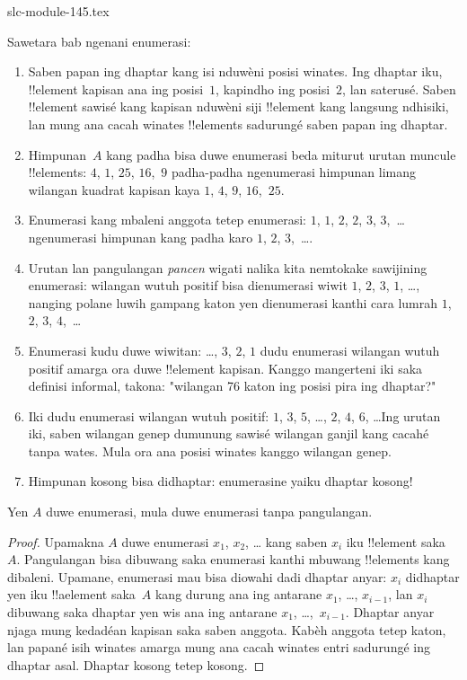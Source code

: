 \begin{filecontents*}[overwrite]{slc-module-145.tex}
\begin{explain}
Sawetara bab ngenani enumerasi:
\begin{enumerate}
\item Saben papan ing dhaptar kang isi nduwèni posisi winates. Ing dhaptar iku, !!{element} kapisan
  ana ing posisi~$1$, kapindho ing posisi~$2$, lan saterusé.
  Saben !!{element} sawisé kang kapisan nduwèni siji !!{element}
  kang langsung ndhisiki, lan mung ana cacah winates !!{element}s
  sadurungé saben papan ing dhaptar.
\item Himpunan~$A$ kang padha bisa duwe enumerasi beda
  miturut urutan muncule !!{element}s: $4$, $1$,
  $25$, $16$,~$9$ padha-padha ngenumerasi himpunan limang
  wilangan kuadrat kapisan kaya $1$, $4$, $9$, $16$,~$25$.
\item Enumerasi kang mbaleni anggota tetep enumerasi: $1$, $1$, $2$,
  $2$, $3$, $3$,~\dots{} ngenumerasi himpunan kang padha karo $1$, $2$,
  $3$,~\dots{}.
\item Urutan lan pangulangan \emph{pancen} wigati nalika kita nemtokake
  sawijining enumerasi: wilangan wutuh positif bisa dienumerasi wiwit
  $1$, $2$, $3$, $1$, \dots{}, nanging polane luwih gampang katon
  yen dienumerasi kanthi cara lumrah $1$, $2$, $3$, $4$,~\dots
\item Enumerasi kudu duwe wiwitan: \dots, $3$, $2$, $1$ dudu
  enumerasi wilangan wutuh positif amarga ora duwe !!{element}
  kapisan. Kanggo mangerteni iki saka definisi informal,
  takona: "wilangan 76 katon ing posisi pira ing dhaptar?"
\item Iki dudu enumerasi wilangan wutuh positif:
  $1$, $3$, $5$, \dots, $2$, $4$, $6$, \dots\@ Ing urutan iki,
  saben wilangan genep dumunung sawisé wilangan ganjil kang cacahé tanpa wates.
  Mula ora ana posisi winates kanggo wilangan genep.
\item Himpunan kosong bisa didhaptar: enumerasine yaiku dhaptar kosong!{}
\end{enumerate}
\end{explain}

\begin{prop}
  Yen $A$ duwe enumerasi, mula duwe enumerasi tanpa
  pangulangan.
\end{prop}

\begin{proof}
  Upamakna $A$ duwe enumerasi $x_1$, $x_2$, \dots{} kang saben
  $x_i$ iku !!{element} saka~$A$. Pangulangan bisa dibuwang saka
  enumerasi kanthi mbuwang !!{element}s kang dibaleni. Upamane,
  enumerasi mau bisa diowahi dadi dhaptar anyar: $x_i$ didhaptar yen
  iku !!a{element} saka~$A$ kang durung ana ing antarane $x_1$, \dots,
  $x_{i-1}$, lan $x_i$ dibuwang saka dhaptar yen wis ana ing antarane
  $x_1$, \dots,~$x_{i-1}$. Dhaptar anyar njaga mung kedadéan kapisan saka saben anggota.
  Kabèh anggota tetep katon, lan papané isih winates amarga mung ana
  cacah winates entri sadurungé ing dhaptar asal. Dhaptar kosong tetep kosong.
\end{proof}


\end{filecontents*}
